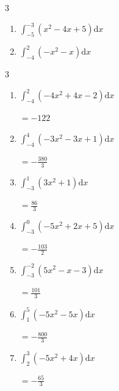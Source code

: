 \begin{multicols}{3}
\begin{enumerate}

  \item $\displaystyle \int_{-5}^{-3}\left( x^{2}-4x+5 \right) \mathrm{d}x$


  \item $\displaystyle \int_{-4}^{2}\left( -x^{2}-x \right) \mathrm{d}x$

        \phantom{$\displaystyle =-18$}

\end{enumerate}
\end{multicols}

\newpage
\resetdrill

\begin{multicols}{3}
\begin{enumerate}
  \itemsep=80pt
  \item $\displaystyle \int_{-4}^{2}\left( -4x^{2}+4x-2 \right) \mathrm{d}x$

        $\displaystyle =-122$

  \item $\displaystyle \int_{-4}^{4}\left( -3x^{2}-3x+1 \right) \mathrm{d}x$

        $\displaystyle =-\frac{380}{3}$

  \item $\displaystyle \int_{-3}^{1}\left( 3x^{2}+1 \right) \mathrm{d}x$

        $\displaystyle =\frac{86}{3}$

  \item $\displaystyle \int_{-3}^{0}\left( -5x^{2}+2x+5 \right) \mathrm{d}x$

        $\displaystyle =-\frac{103}{2}$

  \item $\displaystyle \int_{-3}^{-2}\left( 5x^{2}-x-3 \right) \mathrm{d}x$

        $\displaystyle =\frac{101}{3}$

\columnbreak %

  \item $\displaystyle \int_{1}^{5}\left( -5x^{2}-5x \right) \mathrm{d}x$

        $\displaystyle =-\frac{800}{3}$

  \item $\displaystyle \int_{2}^{3}\left( -5x^{2}+4x \right) \mathrm{d}x$

        $\displaystyle =-\frac{65}{3}$


\end{enumerate}
\end{multicols}
